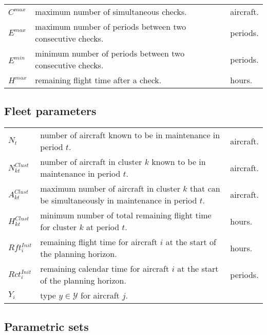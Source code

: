 \documentclass[a4paper,onecolumn,fleqn]{article}
\begin{document}
        \begin{tabular}{p{15mm}p{125mm}p{15mm}}
            $C^{max}$         & maximum number of simultaneous checks. & aircraft. \\
            $E^{max}$         & maximum number of periods between two consecutive checks. & periods. \\
            $E^{min}$         & minimum number of periods between two consecutive checks. & periods. \\
            $H^{max}$         & remaining flight time after a check. & hours. \\
        \end{tabular}

    \subsection{Fleet parameters}

        \begin{tabular}{p{15mm}p{125mm}p{15mm}}
            $N_t$               & number of aircraft known to be in maintenance in period $t$. & aircraft. \\
            $N^{Clust}_{kt}$    & number of aircraft in cluster $k$ known to be in maintenance in period $t$. & aircraft. \\
            $A^{Clust}_{kt}$    & maximum number of aircraft in cluster $k$ that can be simultaneously in maintenance in period $t$. & aircraft. \\
            $H^{Clust}_{kt}$    & minimum number of total remaining flight time for cluster $k$ at period $t$. & hours. \\
            $Rft^{Init}_i$      & remaining flight time for aircraft $i$ at the start of the planning horizon.  & hours.  \\
            $Rct^{Init}_i$      & remaining calendar time for aircraft $i$ at the start of the planning horizon.  & periods. \\
            $Y_i$               & type $y \in \mathcal{Y}$ for aircraft $j$. \\
        \end{tabular}

    \subsection{Parametric sets}
\end{document}

